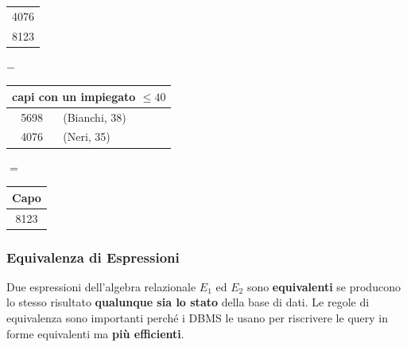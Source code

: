 \documentclass[12pt]{extarticle}
\begin{document}
\begin{enumerate}
\begin{center}
\begin{tabular}{c}
        4076 \\
        8123 \\
        \bottomrule
    \end{tabular}
    \quad $-$ \quad
    \begin{tabular}{cl}
        \toprule
        \multicolumn{2}{c}{capi con un impiegato $\leq 40$} \\
        \midrule
        5698 & (Bianchi, 38) \\
        4076 & (Neri, 35) \\
        \bottomrule
    \end{tabular}
    \quad $=$ \quad
    \begin{tabular}{c}
        \toprule
        \textbf{Capo} \\
        \midrule
        8123 \\
        \bottomrule
    \end{tabular}
    \end{center}
\end{enumerate}
\subsubsection{Equivalenza di Espressioni}
\noindent Due espressioni dell'algebra relazionale $E_1$ ed $E_2$ sono \textbf{equivalenti} se producono lo stesso risultato \textbf{qualunque sia lo stato} della base di dati. Le regole di equivalenza sono importanti perché i DBMS le usano per riscrivere le query in forme equivalenti ma \textbf{più efficienti}.
\end{document}
